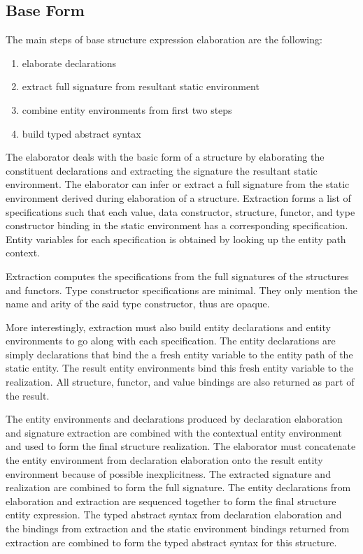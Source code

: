 \subsection{Base Form}
The main steps of base structure expression elaboration are the following:
\begin{enumerate}
	\item elaborate declarations
	\item extract full signature from resultant static environment 
	\item combine entity environments from first two steps
	\item build typed abstract syntax
\end{enumerate}
The elaborator deals with the basic form of a structure by elaborating the constituent declarations and extracting the signature the resultant static environment. The elaborator can infer or extract a full signature from the static environment derived during elaboration of a structure. Extraction forms a list of specifications such that each value, data constructor, structure, functor, and type constructor binding in the static environment has a corresponding specification. Entity variables for each specification is obtained by looking up the entity path context. 

Extraction computes the specifications from the full signatures of the structures and functors. Type constructor specifications are minimal. They only mention the name and arity of the said type constructor, thus are opaque.

More interestingly, extraction must also build entity declarations and entity environments to go along with each specification. The entity declarations are simply declarations that bind the a fresh entity variable to the entity path of the static entity. The result entity environments bind this fresh entity variable to the realization. All structure, functor, and value bindings are also returned as part of the result. 



The entity environments and declarations produced by declaration elaboration and signature extraction are combined with the contextual entity environment and used to form the final structure realization. The elaborator must concatenate the entity environment from declaration elaboration onto the result entity environment because of possible inexplicitness. The extracted signature and realization are combined to form the full signature. The entity declarations from elaboration and extraction are sequenced together to form the final structure entity expression. The typed abstract syntax from declaration elaboration and the bindings from extraction and the static environment bindings returned from extraction are combined to form the typed abstract syntax for this structure. 

